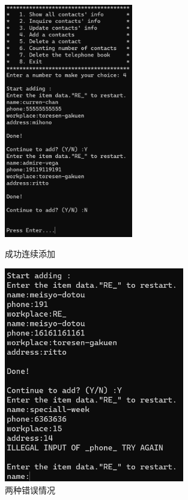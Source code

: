 \documentclass[12pt, a4paper, oneside]{ctexart}
\begin{document}
\begin{figure}[!h]
    \begin{minipage}{0.49\linewidth}
            \centering
            \includegraphics[width=0.5\textwidth]{graphic/06.png}
            \caption{成功连续添加}
            \label{}
    \end{minipage}
    \begin{minipage}{0.49\linewidth}
            \centering
            \includegraphics[width=0.7\textwidth]{graphic/07.png}
            \caption{两种错误情况}
            \label{}
    \end{minipage}
    \end{figure}
\end{document}
